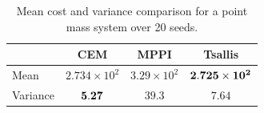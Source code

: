 \bgroup
\begin{table}[t]
    \centering
    \caption{Mean cost and variance comparison for a point mass system over 20 seeds.}
    \begin{tabular}{@{} l  | c | c | c @{}}
    \toprule
     \multicolumn{1}{c}{} & \multicolumn{1}{c}{CEM} & \multicolumn{1}{c}{MPPI} & \multicolumn{1}{c}{Tsallis} \\
    \midrule
    Mean & $2.734 \times 10^2$ & $3.29\times 10^2$ & $\bf{2.725\times 10^2}$ \\
    \midrule
    Variance &  $\bf{5.27}$ & $39.3$ & $7.64$ \\
    \bottomrule
    \end{tabular}
    \label{tab: numerical_data}
\end{table}
\egroup














